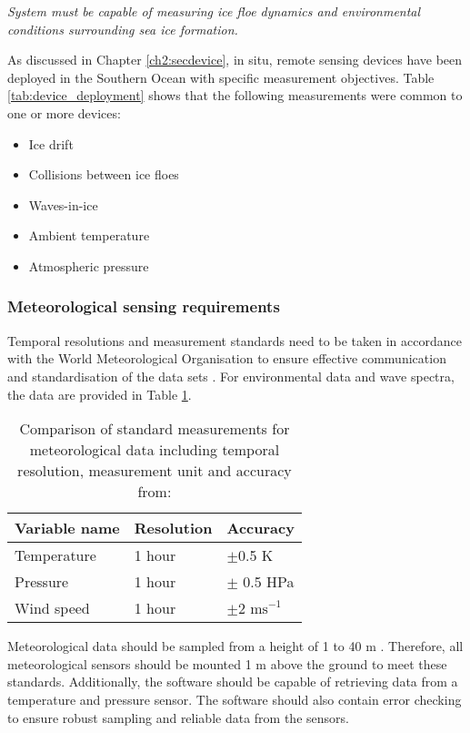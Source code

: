 \textit{System must be capable of measuring ice floe dynamics and environmental conditions surrounding sea ice formation.}

As discussed in Chapter \ref{ch2:secdevice}, in situ, remote sensing devices have been deployed in the Southern Ocean with specific measurement objectives. Table \ref{tab:device_deployment} shows that the following measurements were common to one or more devices:
\begin{itemize}
	\item Ice drift
	\item Collisions between ice floes
	\item Waves-in-ice
	\item Ambient temperature
	\item Atmospheric pressure
\end{itemize}

\subsubsection{Meteorological sensing requirements}

Temporal resolutions and measurement standards need to be taken in accordance with the World Meteorological Organisation to ensure effective communication and standardisation of the data sets \cite{worldmeteorologicalorganization_2010}. For environmental data and wave spectra, the data are provided in Table \ref{tab:metocean}.

\begin{table}[H]
	\centering
	\caption{Comparison of standard measurements for meteorological data including temporal resolution, measurement unit and accuracy from: \cite{worldmeteorologicalorganization_2010}}
	\setlength{\extrarowheight}{5pt}
	\begin{tabular}{lll}
		\hline
		\textbf{Variable name} & \textbf{Resolution} & \textbf{Accuracy}\\
		\hline
		\hline
		Temperature & 1 hour & $\pm$0.5 K \\
		
		Pressure & 1 hour & $\pm$ 0.5 HPa \\
		
		Wind speed & 1 hour & $\pm \text{2 ms}^{-1}$\\
		\hline
	\end{tabular}
	\label{tab:metocean}
\end{table}

Meteorological data should be sampled from a height of 1 to 40 m \cite{worldmeteorologicalorganization_2010}. Therefore, all meteorological sensors should be mounted 1 m above the ground to meet these standards. Additionally, the software should be capable of retrieving data from a temperature and pressure sensor. The software should also contain error checking to ensure robust sampling and reliable data from the sensors. \par 

